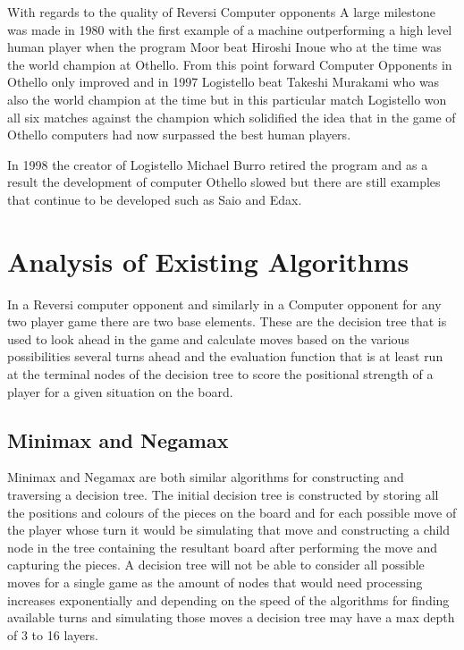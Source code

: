 \documentclass[final]{cmpreport}
\begin{document}
With regards to the quality of Reversi Computer opponents A large milestone was made in 1980 with the first example of a machine outperforming a high level human player when the program Moor beat Hiroshi Inoue who at the time was the world champion at Othello.
From this point forward Computer Opponents in Othello only improved and in 1997 Logistello beat Takeshi Murakami who was also the world champion at the time but in this particular match Logistello won all six matches against the champion which solidified the idea that in the game of Othello computers had now surpassed the best human players.

In 1998 the creator of Logistello Michael Burro retired the program and as a result the development of computer Othello slowed but there are still examples that continue to be developed such as Saio and Edax. 
\section{Analysis of Existing Algorithms}\label{heu}
In a Reversi computer opponent and similarly in a Computer opponent for any two player game there are two base elements. These are the decision tree that is used to look ahead in the game and calculate moves based on the various possibilities several turns ahead and the evaluation function that is at least run at the terminal nodes of the decision tree to score the positional strength of a player for a given situation on the board.
\subsection{Minimax and Negamax}
Minimax and Negamax are both similar algorithms for constructing and traversing a decision tree. The initial decision tree is constructed by storing all the positions and colours of the pieces on the board and for each possible move of the player whose turn it would be simulating that move and constructing a child node in the tree containing the resultant board after performing the move and capturing the pieces. A decision tree will not be able to consider all possible moves for a single game as the amount of nodes that would need processing increases exponentially and depending on the speed of the algorithms for finding available turns and simulating those moves a decision tree may have a max depth of 3 to 16 \citet{SystemAr82:online} layers. 
\end{document}
